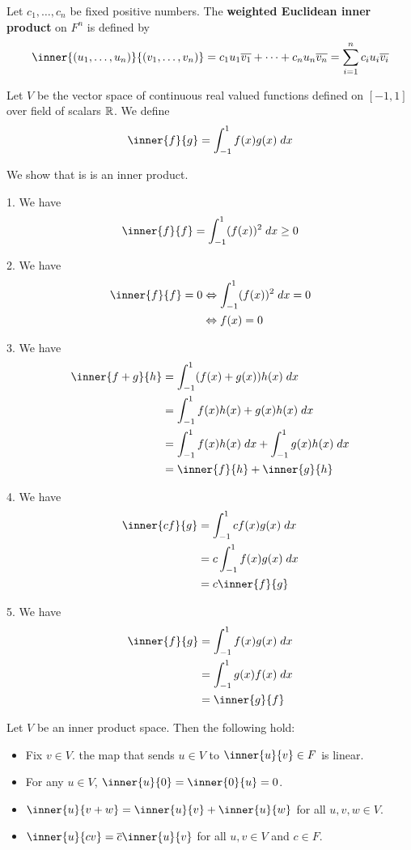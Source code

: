 \documentclass{article}
\begin{document}
    \begin{definition}
      Let $c_1, \ldots, c_n$ be fixed positive numbers. The \textbf{weighted Euclidean inner product} on $F^n$ is defined by \[
        \inner{(u_1, \ldots, u_n)}{(v_1, \ldots, v_n)} = c_1u_1\overline{v_1} + \dots + c_nu_n\overline{v_n} =\sum_{i=1}^n c_iu_i\overline{v_i}
      \]
    \end{definition}
    \begin{example}
      Let $V$ be the vector space of continuous real valued functions defined on $[-1, 1]$ over field of scalars $\mathbb{R}$. We define \[
        \inner{f}{g} = \int_{-1}^1 f(x)g(x) \; dx
      \]

      We show that is is an inner product.

      1. We have \[
        \inner{f}{f} = \int_{-1}^1 (f(x))^2 \; dx \geq 0
      \]

      2. We have
      \begin{align*}
        \inner{f}{f} = 0 &\iff \int_{-1}^1 (f(x))^2 \; dx = 0\\
        &\iff f(x) = 0
      \end{align*}

      3. We have
      \begin{align*}
        \inner{f + g}{h} &= \int_{-1}^1 (f(x) + g(x))h(x) \; dx\\
        &= \int_{-1}^1 f(x)h(x) + g(x)h(x) \; dx\\
        &= \int_{-1}^1 f(x)h(x) \; dx + \int_{-1}^1 g(x)h(x) \; dx\\
        &= \inner{f}{h} + \inner{g}{h}
      \end{align*}

      4. We have
      \begin{align*}
        \inner{cf}{g} &= \int_{-1}^1 cf(x)g(x) \; dx\\
        &= c\int_{-1}^1 f(x)g(x) \; dx\\
        &= c\inner{f}{g}
      \end{align*}

      5. We have
      \begin{align*}
        \inner{f}{g} &= \int_{-1}^1 f(x)g(x) \; dx\\
        &= \int_{-1}^1 g(x)f(x) \; dx\\
        &= \inner{g}{f}\\
      \end{align*}
    \end{example}
    \begin{theorem}
      Let $V$ be an inner product space. Then the following hold:
      \begin{itemize}
        \item Fix $v \in V$. the map that sends $u \in V$ to $\inner{u}{v} \in F$ is linear.
        \item For any $u \in V$, $\inner{u}{0} = \inner{0}{u} = 0$.
        \item $\inner{u}{v+w} = \inner{u}{v} + \inner{u}{w}$ for all $u,v,w \in V$.
        \item $\inner{u}{cv} = \overline{c}\inner{u}{v}$ for all $u, v \in V$ and $c \in F$.
      \end{itemize}
    \end{theorem}
\end{document}
